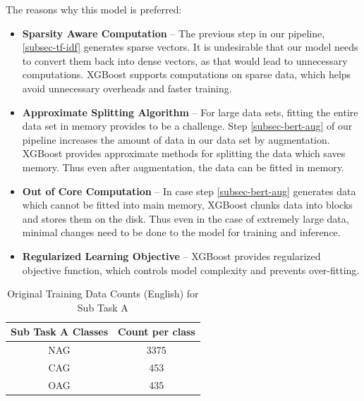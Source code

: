\documentclass[conference]{IEEEtran}
\begin{document}
The reasons why this model is preferred:
\begin{itemize}
    \item \textbf{Sparsity Aware Computation} -- The previous step in our pipeline, \eqref{subsec-tf-idf} generates sparse vectors. It is undesirable that our model needs to convert them back into dense vectors, as that would lead to unnecessary computations. XGBoost supports computations on sparse data, which helps avoid unnecessary overheads and faster training.
    
    \item \textbf{Approximate Splitting Algorithm} -- For large data sets, fitting the entire data set in memory provides to be a challenge. Step \eqref{subsec-bert-aug} of our pipeline increases the amount of data in our data set by augmentation. XGBoost provides approximate methods for splitting the data which saves memory. Thus even after augmentation, the data can be fitted in memory.
    
    \item \textbf{Out of Core Computation} -- In case step \eqref{subsec-bert-aug} generates data which cannot be fitted into main memory, XGBoost chunks data into blocks and stores them on the disk. Thus even in the case of extremely large data, minimal changes need to be done to the model for training and inference.
    
    \item \textbf{Regularized Learning Objective} -- XGBoost provides regularized objective function, which controls model complexity and prevents over-fitting.
\end{itemize}
\begin{table}[!t]
\caption{Original Training Data Counts (English) for Sub Task A}
\label{table:sub-a-table}
\centering
    \begin{tabular}{|c|c|}
        \hline
        \textbf{Sub Task A Classes} & \textbf{Count per class} \\
        \hline
        NAG &  3375   \\
        CAG & 453    \\
        OAG & 435   \\
        \hline
    \end{tabular}
\end{table}
\end{document}
